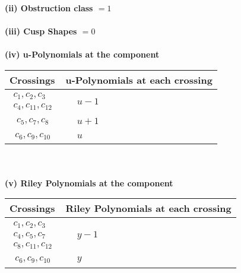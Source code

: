 \documentclass[1p]{elsarticle_modified}
\theoremstyle{definition}
\begin{document}
\flushleft \textbf{(ii) Obstruction class $= 1$}\\~\\
\flushleft \textbf{(iii) Cusp Shapes $= 0$}\\~\\
\newpage\renewcommand{\arraystretch}{1}
\flushleft \textbf{(iv) u-Polynomials at the component}\newline \\
\begin{tabular}{m{50pt}|m{274pt}}
Crossings & \hspace{64pt}u-Polynomials at each crossing \\
\hline $$\begin{aligned}c_{1},c_{2},c_{3}\\c_{4},c_{11},c_{12}\end{aligned}$$&$\begin{aligned}
&u-1
\end{aligned}$\\
\hline $$\begin{aligned}c_{5},c_{7},c_{8}\end{aligned}$$&$\begin{aligned}
&u+1
\end{aligned}$\\
\hline $$\begin{aligned}c_{6},c_{9},c_{10}\end{aligned}$$&$\begin{aligned}
&u
\end{aligned}$\\
\hline
\end{tabular}\\~\\
\newpage\renewcommand{\arraystretch}{1}
\flushleft \textbf{(v) Riley Polynomials at the component}\newline \\
\begin{tabular}{m{50pt}|m{274pt}}
Crossings & \hspace{64pt}Riley Polynomials at each crossing \\
\hline $$\begin{aligned}c_{1},c_{2},c_{3}\\c_{4},c_{5},c_{7}\\c_{8},c_{11},c_{12}\end{aligned}$$&$\begin{aligned}
&y-1
\end{aligned}$\\
\hline $$\begin{aligned}c_{6},c_{9},c_{10}\end{aligned}$$&$\begin{aligned}
&y
\end{aligned}$\\
\hline
\end{tabular}\\~\\
\end{document}
